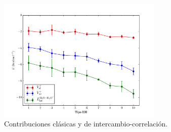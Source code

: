 \begin{figure}[h]
    \centering
    \includegraphics[width=0.70\textwidth]{4/img/Cl_XC}
    \caption{Contribuciones clásicas y de intercambio-correlación.}
\label{cl_xc}
\end{figure}
%
